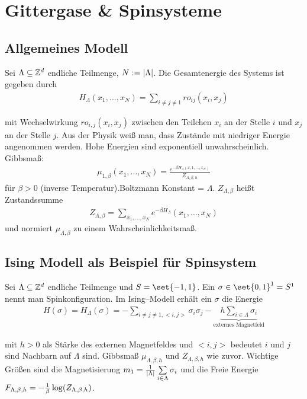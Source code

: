 
\section{Gittergase \& Spinsysteme}

\subsection{Allgemeines Modell}

Sei $\Lambda \subseteq \mathbb{Z}^d$ endliche Teilmenge, $N := \lvert\Lambda\rvert$. Die Gesamtenergie des Systems ist gegeben durch 
\begin{align}
	H_\Lambda (x_1, \dots, x_N) = \sum\limits_{i \neq j \neq 1} ro_{ij} (x_i,x_j)
\end{align}

mit Wechselwirkung $ro_{i,j}(x_i,x_j)$ zwischen den Teilchen $x_i$ an der Stelle $i$ und $x_j$ an der Stelle $j$. Aus der Physik weiß man, dass Zustände mit niedriger Energie angenommen werden. Hohe Energien sind exponentiell unwahrscheinlich. Gibbsmaß:
\begin{align}
	\mu_{1,\beta} (x_1, \dots, x_N) = \frac{e^{-\beta H_{\Lambda}(x,1,\dots, x_N)}}{Z_{\Lambda,\beta,h}}
\end{align}
für $\beta > 0$ (inverse Temperatur).Boltzmann Konstant = $\Lambda$. $Z_{\Lambda,\beta}$ heißt Zustandssumme 
\begin{align}
	Z_{\Lambda,\beta} = \sum\limits_{x_1,\dots,x_N} e^{-\beta H_{\Lambda}}(x_1,\dots, x_N)
\end{align}
und normiert $\mu_{\Lambda,\beta}$ zu einem Wahrscheinlichkeitsmaß.
 \subsection{Ising Modell als Beispiel für Spinsystem}
 Sei $\Lambda \subseteq \mathbb{Z}^d$ endliche Teilmenge und $S=\set{-1,1}$. Ein $\sigma \in \set{0,1}^1 = S^1$ nennt man Spinkonfiguration. Im Ising--Modell erhält ein $\sigma$ die Energie
 \begin{align}
 	H(\sigma) = H_{\Lambda} (\sigma) = - \sum\limits_{i \neq j \neq 1, <i,j>} \sigma_i \sigma_j - \underbrace{h \sum\limits_{i \in \Lambda} \sigma_i}_{\text{externes Magnetfeld}}
 \end{align} 
 
 mit $h>0$ als Stärke des externen Magnetfeldes und $<i,j>$ bedeutet $i$ und $j$ sind Nachbarn auf $\Lambda$ sind. Gibbsmaß $\mu_{\Lambda, \beta, h}$ und $Z_{\Lambda, \beta, h}$ wie zuvor.
 Wichtige Größen sind die Magnetisierung $m_1 = \frac{1}{\lvert\Lambda\rvert} \sum\limits_{i \in \Lambda} \sigma_i$ und die Freie Energie $F_{\Lambda, \beta, h} = -\frac{1}{\beta} \log \enb{Z_{\Lambda,\beta,h}}$.
 
